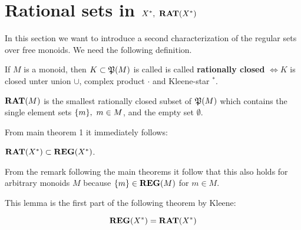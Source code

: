 \section{Rational sets in \texorpdfstring{$X^*,\ \mbox{{\bf RAT}}(X^*)$}{X*,
RAT(X*)}}

In this section we want to introduce a second characterization of the regular
sets over free monoids. We need the following definition.

\begin{definition}
If $M$ is a monoid, then $K \subset \mathfrak{P}({M})$ is called is called {\bf
rationally closed} $\iff K$ is closed unter union $\cup$, complex product
$\cdot$ and Kleene-star $^*$.
\end{definition}

\bigskip
\begin{definition}
$\mbox{{\bf RAT}}(M)$ is the smallest rationally closed subset of $\mathfrak{P}({M})$ which
contains the single element sets $\mbox{$\{m\}$},\ m \in M$, and the empty set
$\emptyset$.
\end{definition}

From main theorem 1 it immediately follows:

\begin{lemma}
$\mbox{{\bf RAT}}(X^*) \subset \mbox{{\bf REG}}(X^*)$.
\end{lemma}

From the remark following the main theorems it follow that this also holds for
arbitrary monoids $M$ because $\mbox{$\{m\}$} \in \mbox{{\bf REG}}(M)$ for $m \in M$.

This lemma is the first part of the following theorem by Kleene:

\begin{theorem}[Kleene]
\[ \mbox{{\bf REG}}(X^*) = \mbox{{\bf RAT}}(X^*) \]
\end{theorem}

